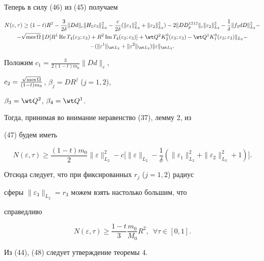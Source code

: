 \begin{pf}
Теперь в силу (46) из (45) получаем 


\begin{multline} 


N(\varepsilon,\tau)\ge(1-t)R^2-\frac{3}{2\delta}\|D d\|_c 


\|H_5\varepsilon_3\|^2_{L_2}-\frac{c}{2\delta} 


(\|\varepsilon_1\|^2_{L_2}+\|\varepsilon_2\|^2_{L_2})- 


2\|D D^{1212}_p\|_c\|\varepsilon_2\|^2_{L_2} -  


\frac{1}{\delta}\|f_3d D\|^2_{L_2}- \\ 


% 


-\sqrt{\mes \Omega}\, 


\|D[R^1\re T_4(\varepsilon_3;\varepsilon_3)+ 


R^2\im T_4(\varepsilon_3;\varepsilon_3)]+  


\wt Q^2K^0_2(\varepsilon_3;\varepsilon_3)- 


\wt Q^1K^0_1(\varepsilon_3;\varepsilon_3)\|_{L_2}- \\ 


% 


-(\|\varepsilon^1\|_{\wt L_2}+\|\varepsilon^2\|_{\wt L_2}) 


\|\varepsilon\|_{\wt L_2}. 


\end{multline} 


Положим $c_1=\frac{3}{2(1-t)m_0}\|D d\|_c$, 


$c_2=\frac{\sqrt{\operatorname{mes}\Omega}}{(1-t)m_0}$, $\beta_j=DR^j$ ($j=1,2$), 


$\beta_3=\wt Q^2$, $\beta_4=\wt Q^1$. 


Тогда, принимая во внимание неравенство (37), лемму 2, из 


(47) будем иметь 


$$ 


N(\varepsilon,\tau)\ge\frac{(1-t)m_0}{2} 


\|\varepsilon\|^2_{L_2}-c\bigg[\|\varepsilon\|_{L_2}-\frac{1}{\delta} 


(\|\varepsilon_1\|^2_{L_2}+\|\varepsilon_2\|^2_{L_2}+1 


)\bigg]. 


$$ 


Отсюда следует, что при фиксированных $r_j$ ($j=1,2$) радиус 


сферы $\|\varepsilon_3\|_{L_2}=r_3$ можем взять настолько большим, что 


справедливо 


\begin{equation} 


N(\varepsilon,\tau)\ge\frac{1-t}{3}\frac{m_0}{M_0}R^2,\ \; 


\forall\tau\in[0,1]. 


\end{equation} 


Из (44), (48) следует утверждение теоремы 4. 


\end{pf} 


